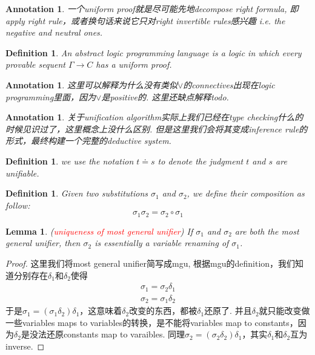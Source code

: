 \documentclass{article}
\theoremstyle{plain}
\newtheorem{lemma}[theorem]{Lemma}
\newtheorem{definition}[theorem]{Definition}
\newtheorem{annotation}[theorem]{Annotation}
\theoremstyle{nonumberplain}
\newtheorem{proof}{Proof}
\newcommand{\redt}[1]{\textcolor{red}{#1}}
\begin{document}
\begin{annotation}
\rm 一个uniform proof就是尽可能先地decompose right formula, 即apply right rule，或者换句话来说它只对right invertible rules感兴趣 i.e. the negative and neutral ones. 
\end{annotation}

\begin{definition}
\rm An \emph{abstract logic programming language} is a logic in which every provable sequent $\Gamma \to C$ has a uniform proof. 
\end{definition}

\begin{annotation}
\rm 这里可以解释为什么没有类似$\vee$的connectives出现在logic programming里面，因为$\vee$是positive的. 这里还缺点解释todo.
\end{annotation}

\begin{annotation}
\rm 关于unification algorithm实际上我们已经在type checking什么的时候见识过了，这里概念上没什么区别. 但是这里我们会将其变成inference rule的形式，最终构建一个完整的deductive system.  
\end{annotation}

\begin{definition}
\rm we use the notation $t \doteq s$ to denote the judgment $t$ and $s$ are unifiable.
\end{definition}

\begin{definition}
\rm Given two substitutions $\sigma_1$ and $\sigma_2$, we define their composition as follow:
\[
	\sigma_1\sigma_2 = \sigma_2 \circ \sigma_1
\]
\end{definition}

\begin{lemma}
\rm (\redt{uniqueness of most general unifier}) If $\sigma_1$ and $\sigma_2$ are both the most general unifier, then $\sigma_2$ is essentially a variable renaming of $\sigma_1$.
\end{lemma}

\begin{proof}
\rm 这里我们将most general unifier简写成mgu, 根据mgu的definition，我们知道分别存在$\delta_1$和$\delta_2$使得
\[
	\begin{gathered}
		\sigma_1  = \sigma_2\delta_1\\
		\sigma_2  = \sigma_1\delta_2		
	\end{gathered}
\]
于是$\sigma_1 = (\sigma_1\delta_2)\delta_1$，这意味着$\delta_2$改变的东西，都被$\delta_1$还原了. 并且$\delta_2$就只能改变做一些variables maps to variables的转换，是不能将variables map to constants，因为$\delta_2$是没法还原constants map to varaibles. 同理$\sigma_2 = (\sigma_2\delta_2)\delta_1$，其实$\delta_1$和$\delta_2$互为inverse. 
\end{proof}
\end{document}
